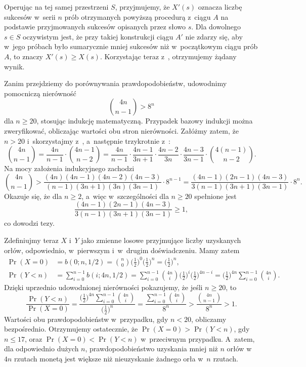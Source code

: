 Operując na tej samej przestrzeni $S$, przyjmujemy, że $X'(s)$ oznacza liczbę sukcesów w~serii $n$ prób otrzymanych powyższą procedurą z~ciągu $A$ na podstawie przyjmowanych sukcesów opisanych przez słowo $s$. Dla dowolnego $s\in S$ oczywistym jest, że przy takiej konstrukcji ciągu $A'$ nie zdarzy się, aby w~jego próbach było sumarycznie mniej sukcesów niż w~początkowym ciągu prób $A$, to znaczy $X'(s)\ge X(s)$. Korzystając teraz z~, otrzymujemy żądany wynik.


\exercise %
Zanim przejdziemy do porównywania prawdopodobieństw, udowodnimy pomocniczą nierówność
\[
    \binom{4n}{n-1} > 8^n
\]
dla $n\ge20$, stosując indukcję matematyczną. Przypadek bazowy indukcji można zweryfikować, obliczając wartości obu stron nierówności. Załóżmy zatem, że $n>20$ i~skorzystajmy z~, a~następnie trzykrotnie z~:
\[
    \binom{4n}{n-1} = \frac{4n}{n-1}\cdot\binom{4n-1}{n-2} = \frac{4n}{n-1}\cdot\frac{4n-1}{3n+1}\cdot\frac{4n-2}{3n}\cdot\frac{4n-3}{3n-1}\cdot\binom{4(n-1)}{n-2}.
\]
Na mocy założenia indukcyjnego zachodzi
\[
    \binom{4n}{n-1} > \frac{(4n)(4n-1)(4n-2)(4n-3)}{(n-1)(3n+1)(3n)(3n-1)}\cdot8^{n-1} = \frac{(4n-1)(2n-1)(4n-3)}{3(n-1)(3n+1)(3n-1)}\cdot8^n.
\]
Okazuje się, że dla $n\ge2$, a~więc w~szczególności dla $n\ge20$ spełnione jest
\[
    \frac{(4n-1)(2n-1)(4n-3)}{3(n-1)(3n+1)(3n-1)} \ge 1,
\]
co dowodzi tezy.

Zdefiniujmy teraz $X$ i~$Y$ jako zmienne losowe przyjmujące liczby uzyskanych orłów, odpowiednio, w~pierwszym i~w~drugim doświadczeniu. Mamy zatem
\begin{align*}
	\Pr(X=0) &= b(0;n,1/2) = \binom{n}{0}\biggl(\frac{1}{2}\biggr)^0\biggl(\frac{1}{2}\biggr)^n = \biggl(\frac{1}{2}\biggr)^n, \\
	\Pr(Y<n) &= \sum_{i=0}^{n-1}b(i;4n,1/2) = \sum_{i=0}^{n-1}\binom{4n}{i}\biggl(\frac{1}{2}\biggr)^i\biggl(\frac{1}{2}\biggr)^{4n-i} = \biggl(\frac{1}{2}\biggr)^{4n}\sum_{i=0}^{n-1}\binom{4n}{i}.
\end{align*}
Dzięki uprzednio udowodnionej nierówności pokazujemy, że jeśli $n\ge20$, to
\[
    \frac{\Pr(Y<n)}{\Pr(X=0)} = \frac{\bigl(\frac{1}{2}\bigr)^{4n}\sum_{i=0}^{n-1}\binom{4n}{i}}{\bigl(\frac{1}{2}\bigr)^n} = \frac{\sum_{i=0}^{n-1}\binom{4n}{i}}{8^n} > \frac{\binom{4n}{n-1}}{8^n} > 1.
\]
Wartości obu prawdopodobieństw w~przypadku, gdy $n<20$, obliczamy bezpośrednio. Otrzymujemy ostatecznie, że $\Pr(X=0)>\Pr(Y<n)$, gdy $n\le17$, oraz $\Pr(X=0)<\Pr(Y<n)$ w~przeciwnym przypadku. A~zatem, dla odpowiednio dużych $n$, prawdopodobieństwo uzyskania mniej niż $n$ orłów w~$4n$ rzutach monetą jest większe niż nieuzyskanie żadnego orła w~$n$ rzutach.

